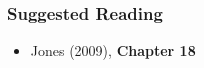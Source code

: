 \documentclass[10pt]{beamer}
\begin{document}
              \begin{frame}
                \frametitle{Suggested Reading}

                \begin{itemize}
                \item Jones (2009), \textbf{Chapter 18}



                \end{itemize}

              \end{frame}


            
\end{document}
